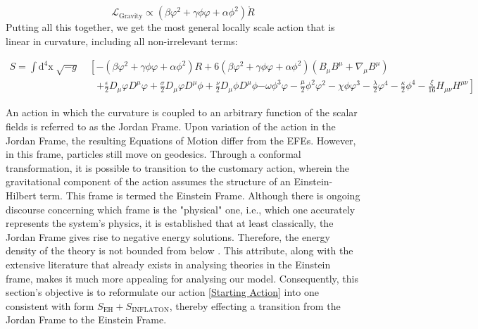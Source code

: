 \documentclass[aps,prd,reprint,preprintnumbers,showpacs,floatfix,nofootinbib,superscript address]{revtex4-2}
\begin{document}
\[
    \mathcal{L}_\text{Gravity} \propto ( \beta \varphi^2 + \gamma \phi \varphi +\alpha \phi^2) \mathring{R}
\]
Putting all this together, we get the most general locally scale action that is linear in curvature, including all non-irrelevant terms:
\begin{widetext} 
    \begin{equations} 
    \begin{align}  \label{Starting Action} 
        S =\int \text{d}^4\text{x} \; \sqrt{-g} &\; \left[ -( \beta \varphi^2 + \gamma \phi \varphi +\alpha \phi^2) R + 6( \beta \varphi^2 + \gamma \phi \varphi +\alpha \phi^2) (B_{\mu} B^{\mu} + \nabla_\mu B^\mu) \right. \nonumber \\
        &\quad \left. +\frac{\epsilon}{2} D_{\mu}\varphi D^{\mu}\varphi + \frac{\sigma}{2} D_{\mu}\varphi D^{\mu}\phi + \frac{\nu}{2} D_{\mu}\phi D^{\mu}\phi \right. \left. - \omega \phi^3 \varphi - \frac{\mu}{2} \phi^2 \varphi^2  - \chi \phi \varphi^3 - \frac{\lambda}{2} \varphi^4 - \frac{\kappa}{2} \phi^4 - \frac{\xi}{16} H_{\mu\nu}H^{\mu\nu} \right]  
    \end{align}
    \end{equations}
\end{widetext}

An action in which the curvature is coupled to an arbitrary function of the scalar fields is referred to as the Jordan Frame. Upon variation of the action in the Jordan Frame, the resulting Equations of Motion differ from the EFEs. However, in this frame, particles still move on geodesics.  Through a conformal transformation, it is possible to transition to the customary action, wherein the gravitational component of the action assumes the structure of an Einstein-Hilbert term. This frame is termed the Einstein Frame. Although there is ongoing discourse concerning which frame is the "physical" one, i.e., which one accurately represents the system's physics, it is established that at least classically, the Jordan Frame gives rise to negative energy solutions. Therefore, the energy density of the theory is not bounded from below \cite{faraoni_einstein_1999, faraoni_conformal_1998, magnano_physical_1994}. This attribute, along with the extensive literature that already exists in analysing theories in the Einstein frame, makes it much more appealing for analysing our model. Consequently, this section's objective is to reformulate our action \ref{Starting Action} into one consistent with form $S_{\text{EH}} + S_{\text{INFLATON}}$, thereby effecting a transition from the Jordan Frame to the Einstein Frame.
\end{document}
